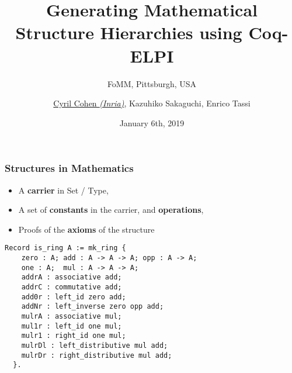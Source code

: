 \documentclass[11pt]{beamer}
\begin{document}
\title[Structure Hierarchies in Coq-ELPI]{{Generating Mathematical} {Structure Hierarchies} {using Coq-ELPI}}
\subtitle{FoMM, Pittsburgh, USA}

\author[\underline{Cohen}, Sakaguchi, Tassi]{
  \underline{Cyril Cohen \textit{(Inria)}}, Kazuhiko Sakaguchi, Enrico
Tassi}


\date{January 6th, 2019}

\begin{frame}
\titlepage
\end{frame}

\begin{frame}[fragile]
  \frametitle{Structures in Mathematics}

  \begin{itemize}
  \item A \textbf{carrier} in Set / Type,
  \item A set of \textbf{constants} in the carrier, and \textbf{operations},
  \item Proofs of the \textbf{axioms} of the structure
  \end{itemize}

  \pause

\begin{lstlisting}
Record is_ring A := mk_ring {
    zero : A; add : A -> A -> A; opp : A -> A;
    one : A;  mul : A -> A -> A;
    addrA : associative add;
    addrC : commutative add;
    add0r : left_id zero add;
    addNr : left_inverse zero opp add;
    mulrA : associative mul;
    mul1r : left_id one mul;
    mulr1 : right_id one mul;
    mulrDl : left_distributive mul add;
    mulrDr : right_distributive mul add;
  }.
\end{lstlisting}

\end{frame}
\end{document}
